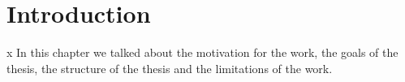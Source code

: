 \section{Introduction} \label{sec:intro}









x
{\color{lightgray}
In this chapter we talked about the motivation for the work, the goals of the thesis,
the structure of the thesis and the limitations of the work.
}